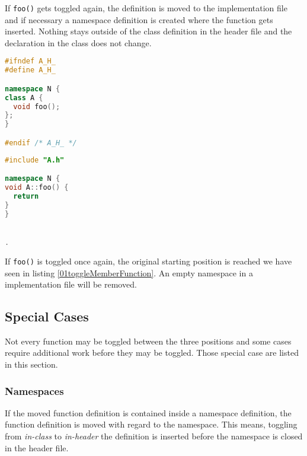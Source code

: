 If \texttt{foo()} gets toggled again, the definition is moved to the
implementation file and if necessary a namespace definition is created where
the function gets inserted. Nothing stays outside of the class definition in the
header file and the declaration in the class does not change.

\vspace{0.5cm}
\begin{minipage}{.48\textwidth}
\lstset{xrightmargin=0.5cm}
\begin{lstlisting}[caption={A.h, after moved definition},
label={03toggleMemberFunction}, language=C++]
#ifndef A_H_
#define A_H_

namespace N {
class A {
  void foo();
};
}

#endif /* A_H_ */
\end{lstlisting}
\end{minipage}%
\begin{minipage}{.48\textwidth}
\lstset{xleftmargin=0.5cm}
\begin{lstlisting}[caption={A.cpp with definition},
label={03_1toggleMemberFunction}, language=C++ ]
#include "A.h"

namespace N {
void A::foo() {
  return
}
}


.
\end{lstlisting}
\end{minipage}

If \texttt{foo()} is toggled once again, the original starting
position is reached we have seen in listing \ref{01toggleMemberFunction}. An
empty namespace in a implementation file will be removed.


\subsection{Special Cases}

Not every function may be toggled between the three positions and some cases 
require additional work before they may be toggled. Those special case are 
listed in this section.

\subsubsection{Namespaces}

If the moved function definition is contained inside a namespace definition,
the function definition is moved with regard to the namespace. This means,
toggling from \textit{in-class} to \textit{in-header} the definition is
inserted before the namespace is closed in the header file.

